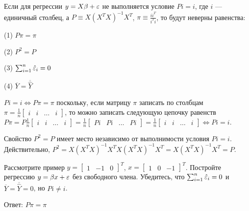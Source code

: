 \begin{problem}
Если для регрессии $y = X\beta + \varepsilon$ не выполняется условие $Pi = i$, где $i$ --- единичный столбец, а $P \equiv X(X^TX)^{-1}X^T$, $\pi \equiv \frac{ii^T}{i^Ti}$, то будут неверны равенства:
\begin{enumerate}
\begin{minipage}[h]{0.49\linewidth}
\item[(1)] $P\pi = \pi$
\item[(2)] $P^2 = P$
\end{minipage}
\hfill
\begin{minipage}[h]{0.49\linewidth}
\item[(3)] $\sum_{i=1}^n \hat{\varepsilon}_i = 0$
\item[(4)] $\overline{Y} = \overline{\hat{Y}}$
\end{minipage}
\end{enumerate}
\end{problem}

\begin{solution} 
$Pi = i \Leftrightarrow P\pi = \pi$ поскольку, если матрицу $\pi$ записать по столбцам $\pi = \frac{1}{n}\begin{bmatrix}
i & i & \ldots & i
\end{bmatrix}$, то можно записать следующую цепочку равенств $P\pi = P\frac{1}{n}\begin{bmatrix}
i & i & \ldots & i
\end{bmatrix} = \frac{1}{n}\begin{bmatrix}
Pi & Pi & \ldots & Pi
\end{bmatrix} = \frac{1}{n}\begin{bmatrix}
i & i & \ldots & i
\end{bmatrix} \Leftrightarrow Pi = i$.

Свойство $P^2 = P$ имеет место независимо от выполнимости условия $Pi = i$. Действительно, $P^2 = X (X^T X)^{-1}X^TX(X^TX)^{-1}X^T = X(X^TX)^{-1}X^T = P$.

Рассмотрите пример $y = \begin{bmatrix}
1 & -1 & 0
\end{bmatrix}^T$, $x = \begin{bmatrix}
1 & 0 & -1
\end{bmatrix}^T$. Постройте регрессию $y = \beta x + \varepsilon$ без свободного члена. Убедитесь, что $\sum_{i=1}^n \hat{\varepsilon}_i = 0$ и $\overline{Y} = \overline{\hat{Y}} = 0$, но $Pi \neq i$.


Ответ: $P\pi = \pi$
\end{solution}




